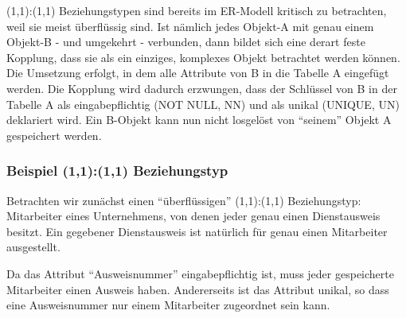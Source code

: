         \begin{center}
        \end{center}
        (1,1):(1,1) Beziehungstypen sind bereits im ER-Modell kritisch zu betrachten, weil sie meist über\-flüs\-sig sind. Ist nämlich jedes Objekt-A mit genau einem Objekt-B - und umgekehrt - verbunden, dann bildet sich eine derart feste Kopplung, dass sie als ein einziges, komplexes Objekt betrachtet werden können. Die Umsetzung erfolgt, in dem alle Attribute von B in die Tabelle A eingefügt werden. Die Kopplung wird dadurch erzwungen, dass der Schlüssel von B in der Tabelle A als eingabepflichtig (NOT NULL, NN) und als unikal (UNIQUE, UN) deklariert wird. Ein B-Objekt kann nun nicht losgelöst von \enquote{seinem} Objekt A gespeichert werden.

        \subsubsection{Beispiel (1,1):(1,1) Beziehungstyp}
          Betrachten wir zunächst einen \enquote{überflüssigen} (1,1):(1,1) Beziehungstyp: Mitarbeiter eines Unternehmens, von denen jeder genau einen Dienstausweis besitzt. Ein gegebener Dienstausweis ist natürlich für genau einen Mitarbeiter ausgestellt.

          Da das Attribut \enquote{Ausweisnummer} eingabepflichtig ist, muss jeder gespeicherte Mitarbeiter einen Ausweis haben. Andererseits ist das Attribut unikal, so dass eine Ausweisnummer nur einem Mitarbeiter zugeordnet sein kann.

